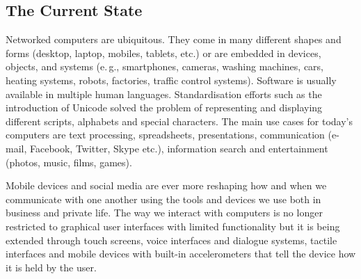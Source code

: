 \documentclass[10pt, plain]{../../metanetpaper}
\begin{document}
\begin{multicols}{2}

\subsection{The Current State}
\label{sec:ict-trends}

%
%
%

Networked computers are ubiquitous. They come in many different shapes and forms (desktop, laptop, mobiles, tablets, etc.) or are embedded in devices, objects, and systems (e.\,g., smartphones, cameras, washing machines, cars, heating systems, robots, factories, traffic control systems). Software is usually available in multiple human languages. Standardisation efforts such as the introduction of Unicode solved the problem of representing and displaying different scripts, alphabets and special characters. The main use cases for today's computers are text processing, spreadsheets, presentations, communication (e-mail, Facebook, Twitter, Skype etc.), information search and entertainment (photos, music, films, games).

Mobile devices and social media are ever more reshaping how and when we communicate with one another using the tools and devices we use both in business and private life. The way we interact with computers is no longer restricted to graphical user interfaces with limited functionality but it is being extended through touch screens, voice interfaces and dialogue systems, tactile interfaces and mobile devices with built-in accelerometers that tell the device how it is held by the user.


\end{multicols}
\end{document}
